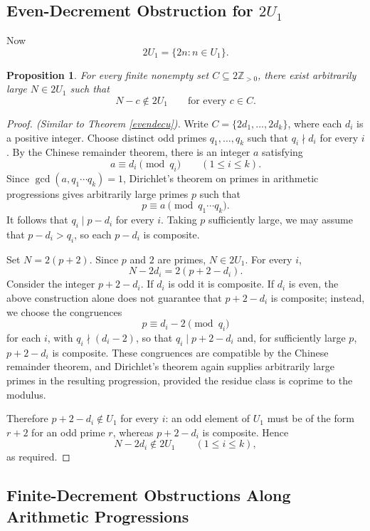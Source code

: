 \documentclass[11pt]{article}
\newtheorem{proposition}{Proposition}
\begin{document}
	\subsection{Even-Decrement Obstruction for $2U_1$}
	
	Now
	\[
	2U_1=\{2n:n\in U_1\}.
	\]
	
	\begin{proposition}\label{evendec2u}
		For every finite nonempty set
		$C\subseteq 2\mathbb{Z}_{>0}$, there exist arbitrarily
		large $N\in 2U_1$ such that
		\[
		N-c\notin 2U_1
		\qquad\text{for every }c\in C.
		\]
	\end{proposition}
	
	\begin{proof}[Proof. (Similar to Theorem \ref{evendecu})]
		Write $C=\{2d_1,\ldots,2d_k\}$, where each $d_i$ is
		a positive integer. Choose distinct odd primes
		$q_1,\ldots,q_k$ such that $q_i\nmid d_i$ for every $i$.
		By the Chinese remainder theorem, there is an integer $a$
		satisfying
		\[
		a\equiv d_i\pmod{q_i}
		\qquad (1\le i\le k).
		\]
		Since $\gcd(a,q_1\cdots q_k)=1$, Dirichlet's theorem on
		primes in arithmetic progressions gives arbitrarily large
		primes $p$ such that
		\[
		p\equiv a\pmod{q_1\cdots q_k}.
		\]
		It follows that $q_i\mid p-d_i$ for every $i$. Taking $p$
		sufficiently large, we may assume that $p-d_i>q_i$, so
		each $p-d_i$ is composite.
		
		Set $N=2(p+2)$. Since $p$ and $2$ are primes, $N\in 2U_1$.
		For every $i$,
		\[
		N-2d_i=2(p+2-d_i).
		\]
		Consider the integer $p+2-d_i$. If $d_i$ is odd it is composite.
		If $d_i$ is even, the above construction alone
		does not guarantee that $p+2-d_i$ is composite; instead,
		we choose the congruences
		\[
		p\equiv d_i-2\pmod{q_i}
		\]
		for each $i$, with $q_i\nmid(d_i-2)$, so that
		$q_i\mid p+2-d_i$ and, for sufficiently large $p$,
		$p+2-d_i$ is composite. These congruences are compatible
		by the Chinese remainder theorem, and Dirichlet's theorem
		again supplies arbitrarily large primes in the resulting
		progression, provided the residue class is coprime to the
		modulus.
		
		Therefore $p+2-d_i\notin U_1$ for every $i$: an odd element
		of $U_1$ must be of the form $r+2$ for an odd prime $r$,
		whereas $p+2-d_i$ is composite. Hence
		\[
		N-2d_i\notin 2U_1
		\qquad (1\le i\le k),
		\]
		as required.
	\end{proof}
	
	\subsection{Finite-Decrement Obstructions Along Arithmetic Progressions}
	
\end{document}

